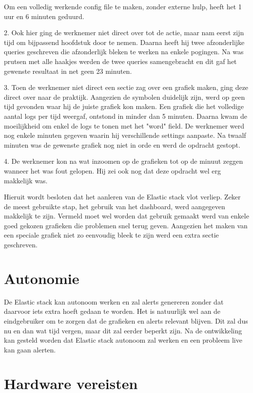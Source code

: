Om een volledig werkende config file te maken, zonder externe hulp, heeft het 1 uur en 6 minuten geduurd.

2. Ook hier ging de werknemer niet direct over tot de actie, maar nam eerst zijn tijd om bijpassend hoofdstuk door te nemen. 
Daarna heeft hij twee afzonderlijke queries geschreven die afzonderlijk bleken te werken na enkele pogingen. Na was prutsen met alle haakjes werden de twee queries samengebracht en dit gaf het gewenste resultaat in net geen 23 minuten.

3. Toen de werknemer niet direct een sectie zag over een grafiek maken, ging deze direct over naar de praktijk. Aangezien de symbolen duidelijk zijn, werd op geen tijd gevonden waar hij de juiste grafiek kon maken.
Een grafiek die het volledige aantal logs per tijd weergaf, ontstond in minder dan 5 minuten. Daarna kwam de moeilijkheid om enkel de logs te tonen met het "word" field. 
De werknemer werd nog enkele minuten gegeven waarin hij verschillende settings aanpaste. Na twaalf minuten was de gewenste grafiek nog niet in orde en werd de opdracht gestopt.

4. De werknemer kon na wat inzoomen op de grafieken tot op de minuut zeggen wanneer het was fout gelopen. Hij zei ook nog dat deze opdracht wel erg makkelijk was.
	

Hieruit wordt besloten dat het aanleren van de Elastic stack vlot verliep. Zeker de meest gebruikte stap, het gebruik van het dashboard, werd aangegeven makkelijk te zijn.
Vermeld moet wel worden dat gebruik gemaakt werd van enkele goed gekozen grafieken die problemen snel terug geven. 
Aangezien het maken van een speciale grafiek niet zo eenvoudig bleek te zijn werd een extra sectie geschreven. 
	
\section{Autonomie}
\label{sec:autonomie}	
	
De Elastic stack kan autonoom werken en zal alerts genereren zonder dat daarvoor iets extra hoeft gedaan te worden. 
Het is natuurlijk wel aan de eindgebruiker om te zorgen dat de grafieken en alerts relevant blijven. Dit zal dus nu en dan wat tijd vergen, maar dit zal eerder beperkt zijn. 
Na de ontwikkeling kan gesteld worden dat Elastic stack autonoom zal werken en een probleem live kan gaan alerten. 
	
	
\section{Hardware vereisten}
\label{sec:hardware-vereisten}
	
